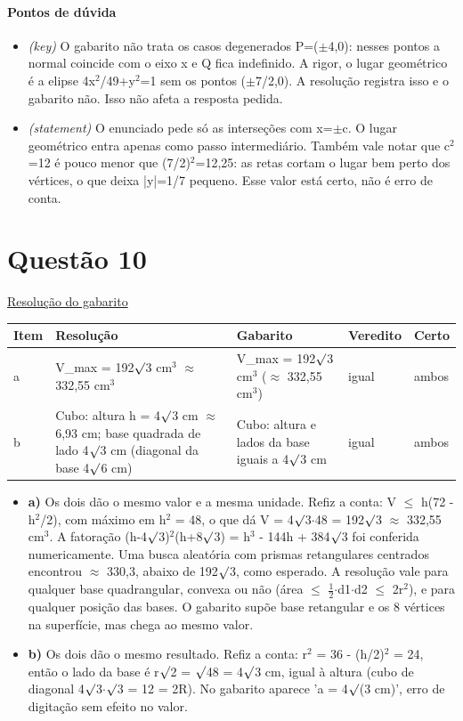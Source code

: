 \documentclass{article}%
\begin{document}
\paragraph{Pontos de dúvida}%
\begin{itemize}%
\item%
\textit{(key)} O gabarito não trata os casos degenerados P=($\pm$4,0): nesses pontos a normal coincide com o eixo x e Q fica indefinido. A rigor, o lugar geométrico é a elipse 4x$^2$/49+y$^2$=1 sem os pontos ($\pm$7/2,0). A resolução registra isso e o gabarito não. Isso não afeta a resposta pedida.%
\item%
\textit{(statement)} O enunciado pede só as interseções com x=$\pm$c. O lugar geométrico entra apenas como passo intermediário. Também vale notar que c$^2$=12 é pouco menor que (7/2)$^2$=12,25: as retas cortam o lugar bem perto dos vértices, o que deixa |y|=1/7 pequeno. Esse valor está certo, não é erro de conta.%
\end{itemize}%
\section*{Questão 10}%
\href{https://poliedroresolve.sistemapoliedro.com.br/vestibulares/ime/2027/ime-2-fase-dia-1-26-10-2026-2-fase-dia-1/dissertativa-10-matematica-2-fase-dia-1-ime-2027}{Resolução do gabarito}\par\smallskip%
\begin{longtable}{@{}p{} p{} p{} p{} p{}@{}}\toprule Item & Resolução & Gabarito & Veredito & Certo \\ \midrule
a & V\_max = 192$\surd$3 cm$^3$ $\approx$ 332,55 cm$^3$ & V\_max = 192$\surd$3 cm$^3$ ($\approx$ 332,55 cm$^3$) & igual & ambos \\
b & Cubo: altura h = 4$\surd$3 cm $\approx$ 6,93 cm; base quadrada de lado 4$\surd$3 cm (diagonal da base 4$\surd$6 cm) & Cubo: altura e lados da base iguais a 4$\surd$3 cm & igual & ambos \\
\bottomrule\end{longtable}%
\begin{itemize}%
\item%
\textbf{a)} Os dois dão o mesmo valor e a mesma unidade. Refiz a conta: V $\leq$ h(72 - h$^2$/2), com máximo em h$^2$ = 48, o que dá V = 4$\surd$3$\cdot$48 = 192$\surd$3 $\approx$ 332,55 cm$^3$. A fatoração (h-4$\surd$3)$^2$(h+8$\surd$3) = h$^3$ - 144h + 384$\surd$3 foi conferida numericamente. Uma busca aleatória com prismas retangulares centrados encontrou $\approx$ 330,3, abaixo de 192$\surd$3, como esperado. A resolução vale para qualquer base quadrangular, convexa ou não (área $\leq$ $\frac12$$\cdot$d1$\cdot$d2 $\leq$ 2r$^2$), e para qualquer posição das bases. O gabarito supõe base retangular e os 8 vértices na superfície, mas chega ao mesmo valor.%
\item%
\textbf{b)} Os dois dão o mesmo resultado. Refiz a conta: r$^2$ = 36 - (h/2)$^2$ = 24, então o lado da base é r$\surd$2 = $\surd$48 = 4$\surd$3 cm, igual à altura (cubo de diagonal 4$\surd$3$\cdot$$\surd$3 = 12 = 2R). No gabarito aparece 'a = 4$\surd$(3 cm)', erro de digitação sem efeito no valor.%
\end{itemize}%
\end{document}
